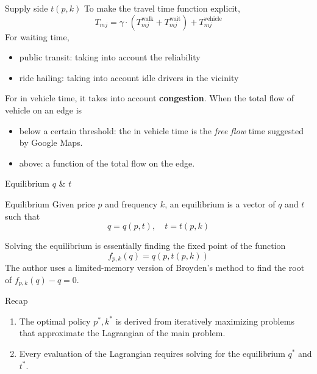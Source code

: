 \documentclass[10pt, aspectratio=169]{beamer}
\begin{document}
\begin{frame}{Supply side $t(p,k)$}
  To make the travel time function explicit,
  \begin{equation*}
    T_{mj} = \gamma \cdot \left( T_{mj}^{\text{walk}} + T_{mj}^{\text{wait}} \right) + T_{mj}^{\text{vehicle}}
  \end{equation*}
  For waiting time,
  \begin{itemize}
    \item public transit: taking into account the reliability
    \item ride hailing: taking into account idle drivers in the vicinity
  \end{itemize}
  For in vehicle time, it takes into account \textbf{congestion}. When the total flow of vehicle on an edge is
  \begin{itemize}
    \item  below a certain threshold: the in vehicle time is the \textit{free flow} time
          suggested by Google Maps.
    \item above: a function of the total flow on the edge.
  \end{itemize}
\end{frame}
\begin{frame}{Equilibrium $q$ \& $t$}
  \begin{block}{Equilibrium}
    Given price $p$ and frequency $k$, an equilibrium is a vector of $q$ and $t$
    such that
    \begin{equation*}
      q = q(p,t), \quad t = t(p,k)
    \end{equation*}
  \end{block}
  Solving the equilibrium is essentially finding the fixed point of the function
  \begin{equation*}
    f_{p,k}(q)=q(p,t(p,k))
  \end{equation*}
  The author uses a limited-memory version of Broyden's method to find the root of $f_{p,k}(q)-q=0$.
\end{frame}
\begin{frame}{Recap}
  \begin{enumerate}
    \item The optimal policy $p^*, k^*$ is derived from iteratively maximizing problems
          that approximate the Lagrangian of the main problem.
    \item Every evaluation of the Lagrangian requires solving for the equilibrium $q^*$
          and $t^*$.
  \end{enumerate}
\end{frame}
\end{document}
